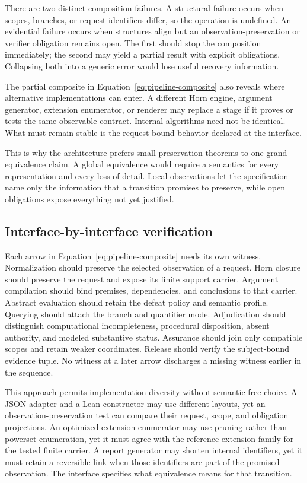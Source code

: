 There are two distinct composition failures. A structural failure occurs when scopes, branches, or request identifiers differ, so the operation is undefined. An evidential failure occurs when structures align but an observation-preservation or verifier obligation remains open. The first should stop the composition immediately; the second may yield a partial result with explicit obligations. Collapsing both into a generic error would lose useful recovery information.

The partial composite in Equation~\eqref{eq:pipeline-composite} also reveals where alternative implementations can enter. A different Horn engine, argument generator, extension enumerator, or renderer may replace a stage if it proves or tests the same observable contract. Internal algorithms need not be identical. What must remain stable is the request-bound behavior declared at the interface.

This is why the architecture prefers small preservation theorems to one grand equivalence claim. A global equivalence would require a semantics for every representation and every loss of detail. Local observations let the specification name only the information that a transition promises to preserve, while open obligations expose everything not yet justified.

\subsection{Interface-by-interface verification}

Each arrow in Equation~\eqref{eq:pipeline-composite} needs its own witness. Normalization should preserve the selected observation of a request. Horn closure should preserve the request and expose its finite support carrier. Argument compilation should bind premises, dependencies, and conclusions to that carrier. Abstract evaluation should retain the defeat policy and semantic profile. Querying should attach the branch and quantifier mode. Adjudication should distinguish computational incompleteness, procedural disposition, absent authority, and modeled substantive status. Assurance should join only compatible scopes and retain weaker coordinates. Release should verify the subject-bound evidence tuple. No witness at a later arrow discharges a missing witness earlier in the sequence.

This approach permits implementation diversity without semantic free choice. A JSON adapter and a Lean constructor may use different layouts, yet an observation-preservation test can compare their request, scope, and obligation projections. An optimized extension enumerator may use pruning rather than powerset enumeration, yet it must agree with the reference extension family for the tested finite carrier. A report generator may shorten internal identifiers, yet it must retain a reversible link when those identifiers are part of the promised observation. The interface specifies what equivalence means for that transition.

